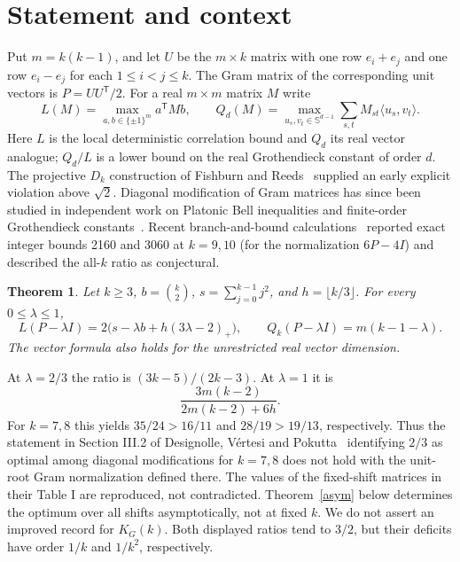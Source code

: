 \documentclass[11pt]{article}
\newtheorem{theorem}{Theorem}\newtheorem{lemma}[theorem]{Lemma}
\begin{document}
\section{Statement and context}
Put $m=k(k-1)$, and let $U$ be the $m\times k$ matrix with one row $e_i+e_j$ and one row $e_i-e_j$ for each $1\le i<j\le k$. The Gram matrix of the corresponding unit vectors is $P=UU^\mathsf{T}/2$. For a real $m\times m$ matrix $M$ write
\[
 L(M)=\max_{a,b\in\{\pm1\}^m}a^\mathsf{T}Mb,\qquad
 Q_d(M)=\max_{u_s,v_t\in\mathbb{S}^{d-1}}\sum_{s,t}M_{st}\langle u_s,v_t\rangle .
\]
Here $L$ is the local deterministic correlation bound and $Q_d$ its real vector analogue; $Q_d/L$ is a lower bound on the real Grothendieck constant of order $d$. The projective $D_k$ construction of Fishburn and Reeds~\cite{FR} supplied an early explicit violation above $\sqrt2$. Diagonal modification of Gram matrices has since been studied in independent work on Platonic Bell inequalities and finite-order Grothendieck constants~\cite{PV,DVP}. Recent branch-and-bound calculations~\cite{IBB} reported exact integer bounds 2160 and 3060 at $k=9,10$ (for the normalization $6P-4I$) and described the all-$k$ ratio as conjectural.
\begin{theorem}\label{main}
Let $k\ge3$, $b=\binom{k}{2}$, $s=\sum_{j=0}^{k-1} j^2$, and $h=\lfloor k/3\rfloor$. For every $0\le\lambda\le1$,
\[
 \boxed{L(P-\lambda I)=2\bigl(s-\lambda b+h(3\lambda-2)_+\bigr),\qquad
 Q_k(P-\lambda I)=m(k-1-\lambda).}
\]
The vector formula also holds for the unrestricted real vector dimension.
\end{theorem}
At $\lambda=2/3$ the ratio is $(3k-5)/(2k-3)$. At $\lambda=1$ it is
\[
 \frac{3m(k-2)}{2m(k-2)+6h}.
\]
For $k=7,8$ this yields $35/24>16/11$ and $28/19>19/13$, respectively. Thus the statement in Section III.2 of Designolle, V\'ertesi and Pokutta~\cite{DVP} identifying $2/3$ as optimal among diagonal modifications for $k=7,8$ does not hold with the unit-root Gram normalization defined there. The values of the fixed-shift matrices in their Table I are reproduced, not contradicted. Theorem~\ref{asym} below determines the optimum over all shifts asymptotically, not at fixed $k$. We do not assert an improved record for $K_G(k)$. Both displayed ratios tend to $3/2$, but their deficits have order $1/k$ and $1/k^2$, respectively.
\end{document}

